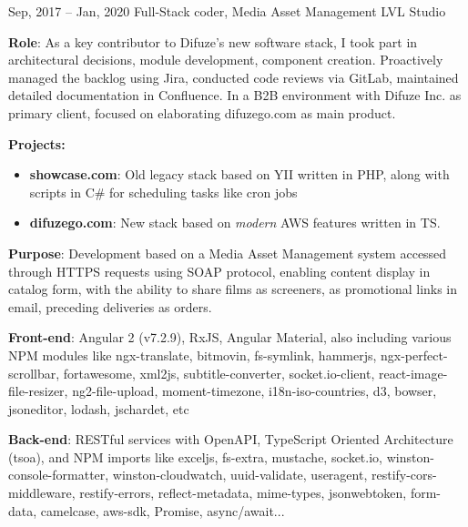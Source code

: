\documentclass[
  a4paper,
   maincolor=cvblue,
   sectioncolor=cvblue,
   sidebarwidth=0.323\paperwidth,
]{fortysecondscv}
\begin{document}
\begin{cvtableNew}
      \vspace{1.6mm} %

  \cvitemRightNew
    {Sep, 2017 – Jan, 2020} %
    {Full-Stack coder, Media Asset Management} %
    {LVL Studio} %
      {
        \vspace{0.2pt} %
        \fontsize{10.8pt}{12pt}\selectfont %
        \textbf{Role}: As a key contributor to Difuze’s new software stack, I took part in architectural decisions,
        module development, component creation. Proactively managed the backlog using Jira, conducted code reviews via GitLab, maintained detailed documentation in Confluence. In a B2B environment with Difuze Inc. as primary client, focused on elaborating difuzego.com as main product.\vspace{5pt}

        \vspace{0.1pt} %
        \textbf{Projects:}
        \begin{itemize}[itemsep=1mm, topsep=5pt, leftmargin=8pt]
          \item \textbf{showcase.com}: Old legacy stack based on YII written in PHP, along with scripts in C\# for scheduling tasks like cron jobs
          \item \textbf{difuzego.com}: New stack based on \textit{modern} AWS features written in TS.
        \end{itemize}

        \vspace{4pt} %
        \textbf{Purpose}: Development based on a Media Asset Management system accessed through HTTPS requests using SOAP protocol, enabling content display in catalog form, with the ability to share films as screeners, as promotional links in email, preceding deliveries as orders.\vspace{5pt}

        \textbf{Front-end}: Angular 2 (v7.2.9), RxJS, Angular Material, also including various NPM modules like ngx-translate, bitmovin, fs-symlink, hammerjs, ngx-perfect-scrollbar, fortawesome, xml2js, subtitle-converter, socket.io-client, react-image-file-resizer, ng2-file-upload, moment-timezone, i18n-iso-countries, d3, bowser, jsoneditor, lodash, jschardet, etc\vspace{5pt}

        \textbf{Back-end}: RESTful services with OpenAPI, TypeScript Oriented Architecture (tsoa), and NPM imports like exceljs, fs-extra, mustache, socket.io, winston-console-formatter, winston-cloudwatch, uuid-validate, useragent, restify-cors-middleware, restify-errors, reflect-metadata, mime-types, jsonwebtoken, form-data, camelcase, aws-sdk, Promise, async/await...\vspace{5pt}

}
\end{cvtableNew}
\end{document}
